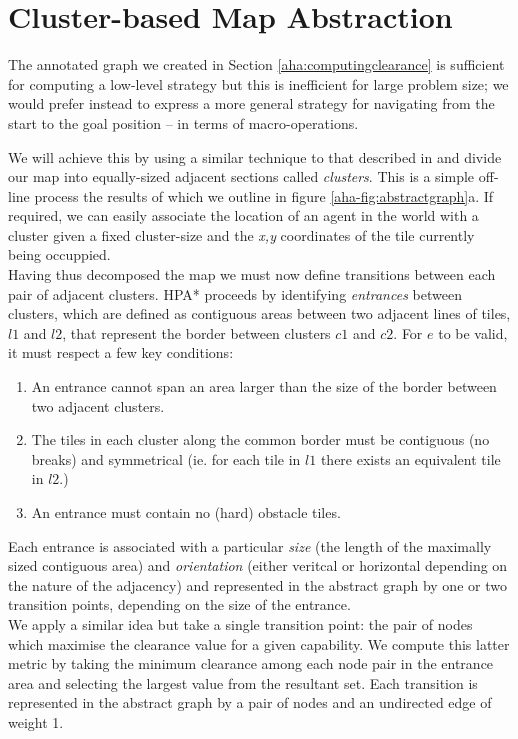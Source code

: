 \section{Cluster-based Map Abstraction}
\label{aha:mapabstraction}
The annotated graph we created in Section \ref{aha:computingclearance} is sufficient for computing a low-level strategy but this is inefficient for large problem size; we would prefer instead to express a more general strategy for navigating from the start to the goal position -- in terms of macro-operations.

We will achieve this by using a similar technique to that described in \cite{botea04} and divide our map into equally-sized adjacent sections called \emph{clusters}. This is a simple off-line process the results of which we outline in figure \ref{aha-fig:abstractgraph}a. If required, we can easily associate the location of an agent in the world with a cluster given a fixed cluster-size and the \emph{x,y} coordinates of the tile currently being occuppied.\\ \newline
Having thus decomposed the map we must now define transitions between each pair of adjacent clusters. HPA* proceeds by identifying \emph{entrances} between clusters, which are defined as contiguous areas between two adjacent lines of tiles, $l1$ and $l2$, that represent the border between clusters $c1$ and $c2$. For $e$ to be valid, it must respect a few key conditions:
\begin{enumerate}
\item{An entrance cannot span an area larger than the size of the border between two adjacent clusters.}
\item{The tiles in each cluster along the common border must be contiguous (no breaks) and symmetrical (ie. for each tile in $l1$ there exists an equivalent tile in $l2$.)}
\item{An entrance must contain no (hard) obstacle tiles.}
\end{enumerate}
Each entrance is associated with a particular \emph{size} (the length of the maximally sized contiguous area) and \emph{orientation} (either veritcal or horizontal depending on the nature of the adjacency) and represented in the abstract graph by one or two transition points, depending on the size of the entrance. \\ \newline
We apply a similar idea but take a single transition point: the pair of nodes which maximise the clearance value for a given capability. We compute this latter metric by taking the minimum clearance among each node pair in the entrance area and selecting the largest value from the resultant set. Each transition is represented in the abstract graph by a pair of nodes and an undirected edge of weight 1.\\
